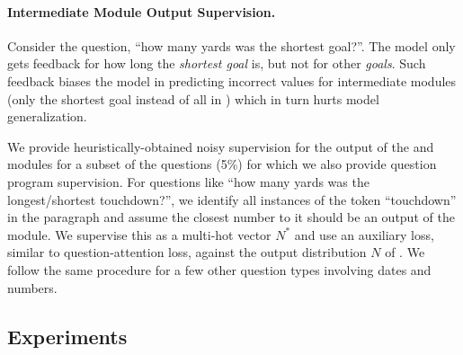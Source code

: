 \documentclass[main.tex]{subfiles}
\begin{document}
\paragraph{Intermediate Module Output Supervision.}
Consider the question, ``how many yards was the shortest goal?''.
The model only gets feedback for how long the \textit{shortest goal} is, but not for other \textit{goals}.
Such feedback biases the model in predicting incorrect values for intermediate modules (only the shortest goal instead of all in ) which in turn hurts model generalization.

We provide heuristically-obtained noisy supervision for the output of the  and  modules for a subset of the questions (5\%) for which we also provide question program supervision. For questions like ``how many yards was the longest/shortest touchdown?'', we identify all instances of the token ``touchdown'' in the paragraph and assume the closest number to it should be an output of the  module. We supervise this as a multi-hot vector $N^{*}$ and use an auxiliary loss, similar to question-attention loss, against the output distribution $N$ of . We follow the same procedure for a few other question types involving dates and numbers. %


\subsection{Experiments}
\label{ssec:exp}
\end{document}
